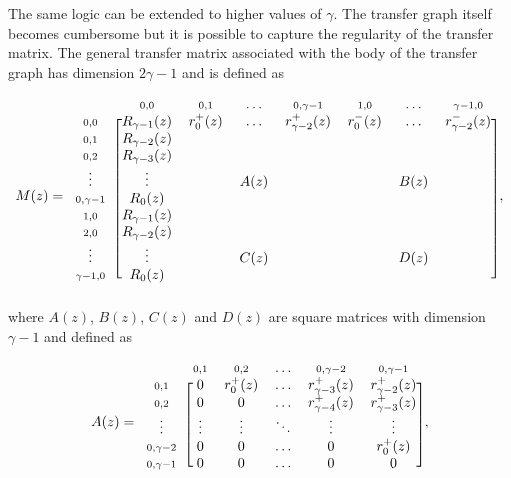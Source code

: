 \documentclass{article}
\begin{document}
The same logic can be extended to higher values of $\gamma$. The transfer
graph itself becomes cumbersome but it is possible to capture the
regularity of the transfer matrix. The general transfer matrix associated
with the body of the transfer graph has dimension $2\gamma-1$ and is
defined as


\begin{equation*}
M(z) =
\begin{blockarray}{cccccccc}
   & \scriptstyle{0,0} & \scriptstyle{0,1} & 
    \ldots & \scriptstyle{0,\gamma-1} &
    \scriptstyle{1,0} & \ldots &
    \scriptstyle{\gamma-1,0}\\
\begin{block}{c[ccccccc]}
\scriptstyle{0,0} & R_{\gamma-1}(z)  & r_0^+(z) & \ldots &
    r_{\gamma-2}^+(z) & r_0^-(z) & \ldots & r_{\gamma-2}^-(z) \\
\scriptstyle{0,1} & R_{\gamma-2}(z) \\
\scriptstyle{0,2} & R_{\gamma-3}(z) \\
\vdots & \vdots & & A(z) & & & B(z) \\
\scriptstyle{0,\gamma-1} & R_0(z) \\
\scriptstyle{1,0} & R_{\gamma-1}(z) \\
\scriptstyle{2,0} & R_{\gamma-2}(z) \\
\vdots & \vdots & & C(z) & & & D(z) \\
\scriptstyle{\gamma-1,0} & R_0(z) \\
\end{block}
\end{blockarray},
\end{equation*}
where $A(z)$, $B(z)$, $C(z)$ and $D(z)$ are square matrices with dimension
$\gamma-1$ and defined as

\begin{equation*}
A(z) = 
\begin{blockarray}{cccccc}
   & \scriptstyle{0,1} & \scriptstyle{0,2} & \ldots &
    \scriptstyle{0,\gamma-2} & \scriptstyle{0,\gamma-1} \\
\begin{block}{c[ccccc]}
\scriptstyle{0,1} & 0 & r_0^+(z) & \ldots &
    r_{\gamma-3}^+(z) & r_{\gamma-2}^+(z) \\
\scriptstyle{0,2} & 0 & 0 & \ldots &
    r_{\gamma-4}^+(z) & r_{\gamma-3}^+(z) \\
\vdots & \vdots & \vdots & \ddots & \vdots & \vdots \\
\scriptstyle{0,\gamma-2} & 0 & 0 & \ldots & 0 & r_0^+(z) \\
\scriptstyle{0,\gamma-1} & 0 & 0 & \ldots & 0 & 0 \\
\end{block}
\end{blockarray},
\end{equation*}
\end{document}
